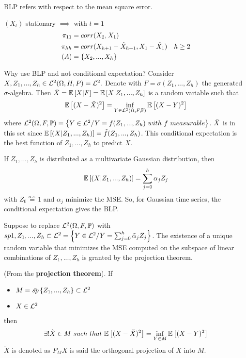 BLP refers with respect to the mean square error.

\begin{remark}
    $(X_t)$ stationary $\implies$ with $t=1$
    \begin{equation*}
        \begin{split}
            \pi_{11}&=corr(X_2,X_1)\\
            \pi_{hh}&=corr(X_{h+1}-\tilde{X}_{h+1},X_1-\tilde{X}_1)\ \ \ h\ge2\\
            (A)&=\set{X_2,...,X_h}\\
        \end{split}
    \end{equation*}
\end{remark}

Why use BLP and not conditional expectation? Consider $X,Z_1,...,Z_h\in\mathcal{L}^{2}(\Omega,H,P)=\mathcal{L}^{2}$. Denote with $F=\sigma(Z_1,...,Z_h)$ the generated $\sigma$-algebra. Then $\bar{X}=\mathbb{E}\left[X|F\right]=\mathbb{E}\left[X|Z_1,...,Z_h\right]$ is a random variable such that
\[
    \mathbb{E}\left[(X-\tilde{X})^2\right]=\inf_{Y\in\mathcal{L}^{2}(\Omega,F,\mathbb{P})}\mathbb{E}\left[(X-Y)^2\right]
\]
where $\el{2}(\Omega,F,\mathbb{P})=\set{Y\in\el{2}/Y=f(Z_1,...,Z_h)\ with\ f\ measurable}$. $\bar{X}$ is in this set since $\mathbb{E}\left[(X|Z_1,...,Z_h)\right]=\tilde{f}(Z_1,...,Z_h)$. This conditional expectation is the best function of $Z_1,...,Z_h$ to predict $X$.

\begin{example}
    If $Z_1,...,Z_h$ is distributed as a multivariate Gaussian distribution, then
    \[
        \mathbb{E}\left[(X|Z_1,...,Z_h)\right]=\sum_{j=0}^h\alpha_jZ_j  
    \]
    with $Z_0\stackrel{a.s.}{=}1$ and $\alpha_j$ minimize the MSE. So, for Gaussian time series, the conditional expectation gives the BLP.
\end{example}

Suppose to replace $\mathcal{L}^{2}(\Omega,F,\mathbb{P})$ with $sp{1,Z_1,...,Z_h}\subset\mathcal{L}^{2}=\left\{Y\in\mathcal{L}^{2}/Y=\sum_{j=0}^h\tilde{\alpha}_jZ_j\right\}$. The existence of a unique random variable that minimizes the MSE computed on the subspace of linear combinations of $Z_1,...,Z_h$ is granted by the projection theorem.

\begin{theorem}
    (From the \textbf{projection theorem}). If
    \begin{itemize}
        \item $M=\bar{sp}\left\{Z_1,...,Z_h\right\}\subset\mathcal{L}^{2}$
        \item $X\in\mathcal{L}^{2}$
    \end{itemize}
    then
    \[
        \exists!\tilde{X}\in M\ such\ that\ \expect{(X-\tilde{X})^2}=\inf_{Y\in M}\expect{(X-Y)^2}  
    \]
    $\tilde{X}$ is denoted as $P_MX$ is said the orthogonal projection of $X$ into $M$.
\end{theorem}


